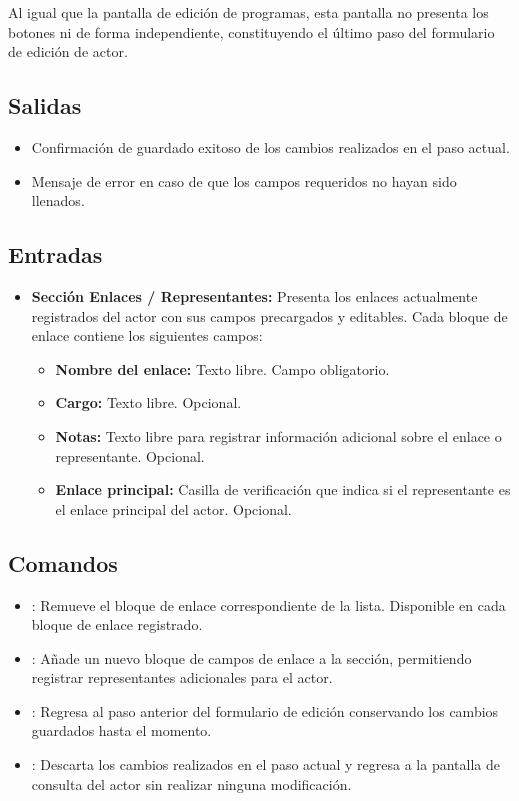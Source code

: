 Al igual que la pantalla de edición de programas, esta pantalla no presenta los 
botones  ni  de forma 
independiente, constituyendo el último paso del formulario de edición de actor.


\subsection{Salidas}
\begin{itemize}
	\item Confirmación de guardado exitoso de los cambios realizados en el paso 
	actual.
	\item Mensaje de error  en 
	caso de que los campos requeridos no hayan sido llenados.
\end{itemize}

\subsection{Entradas}
\begin{itemize}
	\item \textbf{Sección Enlaces / Representantes:} Presenta los enlaces 
	actualmente registrados del actor con sus campos precargados y editables. 
	Cada bloque de enlace contiene los siguientes campos:
	\begin{itemize}
		\item \textbf{Nombre del enlace:} Texto libre. Campo obligatorio.
		\item \textbf{Cargo:} Texto libre. Opcional.
		\item \textbf{Notas:} Texto libre para registrar información adicional 
		sobre el enlace o representante. Opcional.
		\item \textbf{Enlace principal:} Casilla de verificación que indica si 
		el representante es el enlace principal del actor. Opcional.
	\end{itemize}
\end{itemize}

\subsection{Comandos}
\begin{itemize}
	\item {}: Remueve el bloque de enlace correspondiente de 
	la lista. Disponible en cada bloque de enlace registrado.
	\item {}: Añade un nuevo bloque de campos de enlace 
	a la sección, permitiendo registrar representantes adicionales para el actor.
	\item {}: Regresa al paso anterior del formulario de 
	edición conservando los cambios guardados hasta el momento.
	\item {}: Descarta los cambios realizados en el paso actual 
	y regresa a la pantalla de consulta del actor  sin realizar ninguna modificación.
\end{itemize}


